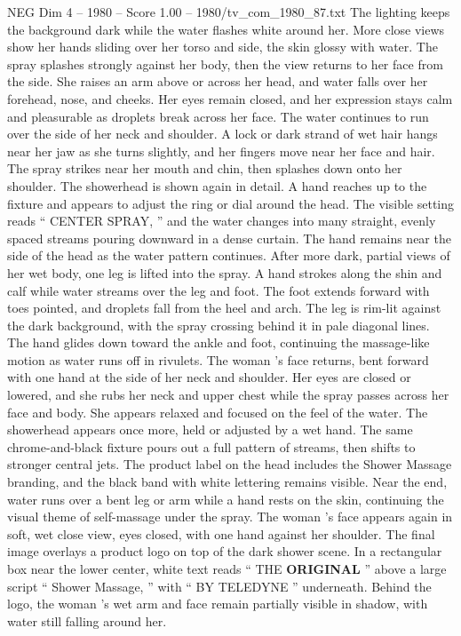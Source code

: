 \begin{textsample}{NEG Dim 4 – 1980 – Score 1.00 – 1980/tv\_com\_1980\_87.txt}
The lighting keeps the background dark while the water flashes white around her.
More close views show her hands sliding over her torso and side, the skin glossy with water.
The spray splashes strongly against her body, then the view returns to her face from the side.
She raises an arm above or across her head, and water falls over her forehead, nose, and cheeks.
Her eyes remain closed, and her expression stays calm and pleasurable as droplets break across her face.
The water continues to run over the side of her neck and shoulder.
A lock or dark strand of wet hair hangs near her jaw as she turns slightly, and her fingers move near her face and hair.
The spray strikes near her mouth and chin, then splashes down onto her shoulder.
The showerhead is shown again in detail.
A hand reaches up to the fixture and appears to adjust the ring or dial around the head.
The visible setting reads “ CENTER SPRAY, ” and the water changes into many straight, evenly spaced streams pouring downward in a dense curtain.
The hand remains near the side of the head as the water pattern continues.
After more dark, partial views of her wet body, one leg is lifted into the spray.
A hand strokes along the shin and calf while water streams over the leg and foot.
The foot extends forward with toes pointed, and droplets fall from the heel and arch.
The leg is rim-lit against the dark background, with the spray crossing behind it in pale diagonal lines.
The hand glides down toward the ankle and foot, continuing the massage-like motion as water runs off in rivulets.
The woman ’s face returns, bent forward with one hand at the side of her neck and shoulder.
Her eyes are closed or lowered, and she rubs her neck and upper chest while the spray passes across her face and body.
She appears relaxed and focused on the feel of the water.
The showerhead appears once more, held or adjusted by a wet hand.
The same chrome-and-black fixture pours out a full pattern of streams, then shifts to stronger central jets.
The product label on the head includes the Shower Massage branding, and the black band with white lettering remains visible.
Near the end, water runs over a bent leg or arm while a hand rests on the skin, continuing the visual theme of self-massage under the spray.
The woman ’s face appears again in soft, wet close view, eyes closed, with one hand against her shoulder.
The final image overlays a product logo on top of the dark shower scene.
In a rectangular box near the lower center, white text reads “ THE \textbf{ORIGINAL} ” above a large script “ Shower Massage, ” with “ BY TELEDYNE ” underneath.
Behind the logo, the woman ’s wet arm and face remain partially visible in shadow, with water still falling around her.

\end{textsample}
